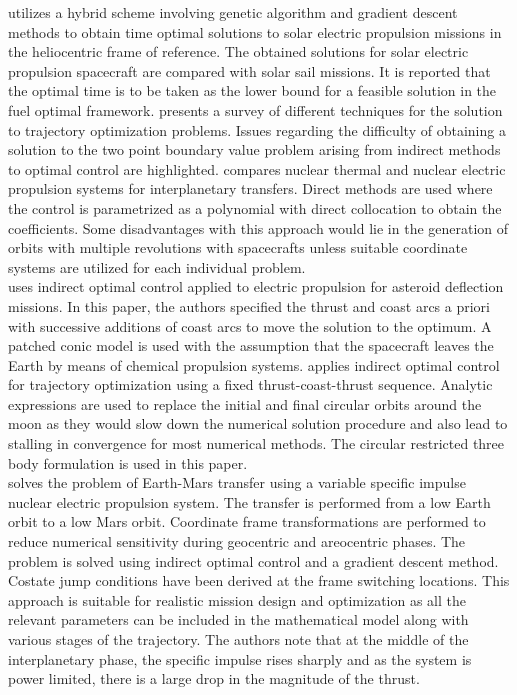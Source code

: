 \cite{quarta_time-optimal_2013} utilizes a hybrid scheme involving genetic algorithm and gradient descent methods to obtain time optimal solutions to solar electric propulsion missions in the heliocentric frame of reference. The obtained solutions for solar electric propulsion spacecraft are compared with solar sail missions. It is reported that the optimal time is to be taken as the lower bound for a feasible solution in the fuel optimal framework.
\cite{betts_survey_1998} presents a survey of different techniques for the solution to trajectory optimization problems. Issues regarding the difficulty of obtaining a solution to the two point boundary value problem arising from indirect methods to optimal control are highlighted. \cite{chiravalle_nuclear_2008} compares nuclear thermal and nuclear electric propulsion systems for interplanetary transfers. Direct methods are used where the control is parametrized as a polynomial with direct collocation to obtain the coefficients. Some disadvantages with this approach would lie in the generation of orbits with multiple revolutions with spacecrafts unless suitable coordinate systems are utilized for each individual problem.\\
\cite{casalino_indirect_2012} uses indirect optimal control applied to electric propulsion for asteroid deflection missions. In this paper, the authors specified the thrust and coast arcs a priori with successive additions of coast arcs to move the solution to the optimum. A patched conic model is used with the assumption that the spacecraft leaves the Earth by means of chemical propulsion systems.
\cite{kluever_optimal_1997} applies indirect optimal control for trajectory optimization using a fixed thrust-coast-thrust sequence. Analytic expressions are used to replace the initial and final circular orbits around the moon as they would slow down the numerical solution procedure and also lead to stalling in convergence for most numerical methods. The circular restricted three body formulation is used in this paper.\\
\cite{nah_fuel-optimal_2001} solves the problem of Earth-Mars transfer using a variable specific impulse nuclear electric propulsion system. The transfer is performed from a low Earth orbit to a low Mars orbit. Coordinate frame transformations are performed to reduce numerical sensitivity during geocentric and areocentric phases. The problem is solved using indirect optimal control and a gradient descent method. Costate jump conditions have been derived at the frame switching locations. This approach is suitable for realistic mission design and optimization as all the relevant parameters can be included in the mathematical model along with various stages of the trajectory. The authors note that at the middle of the interplanetary phase, the specific impulse rises sharply and as the system is power limited, there is a large drop in the magnitude of the thrust.\\
